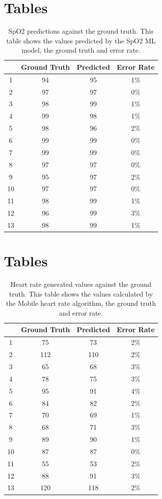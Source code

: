 \documentclass{bmcart}
\begin{document}
\section*{Tables}
\begin{table}[h!]
\caption{SpO2 predictions against the ground truth. This table shows the values predicted by the SpO2 ML model, the ground truth and error rate.}
      \begin{tabular}{cccc}
        \hline
           & Ground Truth  & Predicted & Error Rate\\ \hline
        1 & 94 & 95 & 1\%\\
        2 & 97 & 97 & 0\%\\
        3 & 98 & 99 & 1\%\\
        4 & 99 & 98 & 1\%\\
        5 & 98 & 96 & 2\%\\
        6 & 99 & 99 & 0\%\\
        7 & 99 & 99 & 0\%\\
        8 & 97 & 97 & 0\%\\
        9 & 95 & 97 & 2\%\\
        10& 97 & 97 & 0\%\\
        11& 98 & 99 & 1\%\\
        12& 96 & 99 & 3\%\\
        13& 98 & 99 & 1\%\\ \hline
      \end{tabular}
\end{table}
\section*{Tables}
\begin{table}[h!]
\caption{Heart rate generated values against the ground truth. This table shows the values calculated by the Mobile heart rate algorithm, the ground truth and error rate.}
      \begin{tabular}{cccc}
        \hline
           & Ground Truth  & Predicted & Error Rate\\ \hline
        1 & 75 & 73  & 2\%\\
        2 & 112& 110 & 2\%\\
        3 & 65 & 68  & 3\%\\
        4 & 78 & 75  & 3\%\\
        5 & 95 & 91  & 4\%\\
        6 & 84 & 82  & 2\%\\
        7 & 70 & 69  & 1\%\\
        8 & 68 & 71  & 3\%\\
        9 & 89 & 90  & 1\%\\
        10& 87 & 87  & 0\%\\
        11& 55 & 53  & 2\%\\
        12& 88 & 91  & 3\%\\
        13& 120& 118 & 2\%\\ \hline
      \end{tabular}
\end{table}
\end{document}
